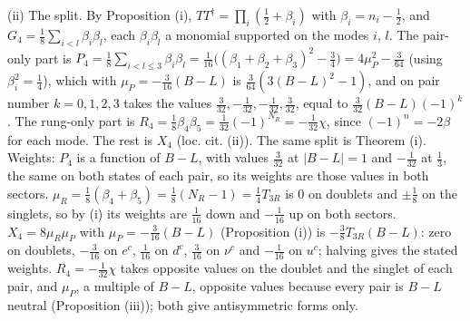 (ii) The split. By Proposition (i), $TT^{\dagger} = \prod_{i}(\tfrac12 + \beta_{i})$ with $\beta_{i} = n_{i} - \tfrac12$, and $G_{4} = \tfrac18\sum_{i < l}\beta_{i}\beta_{l}$, each $\beta_{i}\beta_{l}$ a monomial supported on the modes $i$, $l$. The pair-only part is $P_{4} = \tfrac18\sum_{i < l \le 3}\beta_{i}\beta_{l} = \tfrac{1}{16}\bigl((\beta_{1} + \beta_{2} + \beta_{3})^{2} - \tfrac34\bigr) = 4\mu_{P}^{2} - \tfrac{3}{64}$ (using $\beta_{i}^{2} = \tfrac14$), which with $\mu_{P} = -\tfrac{3}{16}(B - L)$ is $\tfrac{3}{64}(3(B - L)^{2} - 1)$, and on pair number $k = 0, 1, 2, 3$ takes the values $\tfrac{3}{32}, -\tfrac{1}{32}, -\tfrac{1}{32}, \tfrac{3}{32}$, equal to $\tfrac{3}{32}(B - L)(-1)^{k}$. The rung-only part is $R_{4} = \tfrac18\beta_{4}\beta_{5} = \tfrac{1}{32}(-1)^{N_{R}} = -\tfrac{1}{32}\chi$, since $(-1)^{n} = -2\beta$ for each mode. The rest is $X_{4}$ (loc. cit. (ii)). The same split is Theorem (i). Weights: $P_{4}$ is a function of $B - L$, with values $\tfrac{3}{32}$ at $|B - L| = 1$ and $-\tfrac{1}{32}$ at $\tfrac13$, the same on both states of each pair, so its weights are those values in both sectors. $\mu_{R} = \tfrac18(\beta_{4} + \beta_{5}) = \tfrac18(N_{R} - 1) = \tfrac14T_{3R}$ is $0$ on doublets and $\pm\tfrac18$ on the singlets, so by (i) its weights are $\tfrac{1}{16}$ down and $-\tfrac{1}{16}$ up on both sectors. $X_{4} = 8\mu_{R}\mu_{P}$ with $\mu_{P} = -\tfrac{3}{16}(B - L)$ (Proposition (i)) is $-\tfrac{3}{8}T_{3R}(B - L)$: zero on doublets, $-\tfrac{3}{16}$ on $e^{c}$, $\tfrac{1}{16}$ on $d^{c}$, $\tfrac{3}{16}$ on $\nu^{c}$ and $-\tfrac{1}{16}$ on $u^{c}$; halving gives the stated weights. $R_{4} = -\tfrac{1}{32}\chi$ takes opposite values on the doublet and the singlet of each pair, and $\mu_{P}$, a multiple of $B - L$, opposite values because every pair is $B - L$ neutral (Proposition (iii)); both give antisymmetric forms only.

